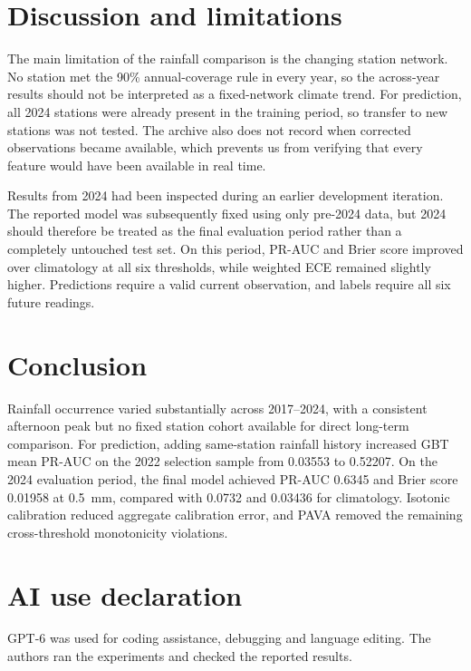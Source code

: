 \section{Discussion and limitations}
The main limitation of the rainfall comparison is the changing station
network. No station met the 90\% annual-coverage rule in every year, so the
across-year results should not be interpreted as a fixed-network climate trend.
For prediction, all 2024 stations were already present in the training period,
so transfer to new stations was not tested. The archive also does not record
when corrected observations became available, which prevents us from
verifying that every feature would have been available in real time.

Results from 2024 had been inspected during an earlier development iteration.
The reported model was subsequently fixed using only pre-2024 data, but 2024
should therefore be treated as the final evaluation period rather than a
completely untouched test set. On this period, PR-AUC and Brier score improved
over climatology at all six thresholds, while weighted ECE remained slightly
higher. Predictions require a valid current observation, and labels require
all six future readings.

\section{Conclusion}
Rainfall occurrence varied substantially across 2017--2024, with a consistent
afternoon peak but no fixed station cohort available for direct long-term
comparison. For prediction, adding same-station rainfall history increased
GBT mean PR-AUC on the 2022 selection sample from 0.03553 to 0.52207. On the
2024 evaluation period, the final model achieved PR-AUC 0.6345 and Brier score
0.01958 at 0.5~mm, compared with 0.0732 and 0.03436 for climatology. Isotonic
calibration reduced aggregate calibration error, and PAVA removed the
remaining cross-threshold monotonicity violations.

\section*{AI use declaration}
GPT-6 was used for coding assistance, debugging and language editing. The
authors ran the experiments and checked the reported results.

